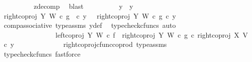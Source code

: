 \begin{isabellebody}
\ \ \ \ \ \ \ \ \isamarkupfalse%
\ z{}{\isacharunderscore}{\kern0pt}decomp\ \isamarkupfalse%
\ blast\isanewline
\ \ \ \ \ \ \ \ \isamarkupfalse%
\ {\isachardoublequoteopen}y{}\ {\isacharequal}{\kern0pt}\ y{}{\isachardoublequoteclose}\isanewline
\ \ \ \ \ \ \ \ \isamarkupfalse%
\ {\isacharminus}{\kern0pt}\ \isanewline
\ \ \ \ \ \ \ \ \ \ \isamarkupfalse%
\ {\isachardoublequoteopen}right{\isacharunderscore}{\kern0pt}coproj\ Y\ W\ {\isasymcirc}\isactrlsub c\ g\ \ {\isasymcirc}\isactrlsub c\ y{}\ \ {\isacharequal}{\kern0pt}\ {\isacharparenleft}{\kern0pt}right{\isacharunderscore}{\kern0pt}coproj\ Y\ W\ {\isasymcirc}\isactrlsub c\ g{\isacharparenright}{\kern0pt}\ {\isasymcirc}\isactrlsub c\ y{}{\isachardoublequoteclose}\isanewline
\ \ \ \ \ \ \ \ \ \ \ \ \isamarkupfalse%
\ comp{\isacharunderscore}{\kern0pt}associative{}\ type{\isacharunderscore}{\kern0pt}assms{\isacharparenleft}{\kern0pt}{}{\isacharparenright}{\kern0pt}\ y{}{\isacharunderscore}{\kern0pt}def\ \isamarkupfalse%
\ {\isacharparenleft}{\kern0pt}typecheck{\isacharunderscore}{\kern0pt}cfuncs{\isacharcomma}{\kern0pt}\ auto{\isacharparenright}{\kern0pt}\isanewline
\ \ \ \ \ \ \ \ \ \ \isamarkupfalse%
\ \isamarkupfalse%
\ {\isachardoublequoteopen}{\isachardot}{\kern0pt}{\isachardot}{\kern0pt}{\isachardot}{\kern0pt}\ {\isacharequal}{\kern0pt}\isanewline
\ \ \ \ \ \ \ \ \ \ \ \ \ \ \ \ {\isacharparenleft}{\kern0pt}{\isacharparenleft}{\kern0pt}{\isacharparenleft}{\kern0pt}left{\isacharunderscore}{\kern0pt}coproj\ Y\ W\ {\isasymcirc}\isactrlsub c\ f{\isacharparenright}{\kern0pt}\ {\isasymamalg}\ {\isacharparenleft}{\kern0pt}right{\isacharunderscore}{\kern0pt}coproj\ Y\ W\ {\isasymcirc}\isactrlsub c\ g{\isacharparenright}{\kern0pt}{\isacharparenright}{\kern0pt}\ {\isasymcirc}\isactrlsub c\ right{\isacharunderscore}{\kern0pt}coproj\ X\ V{\isacharparenright}{\kern0pt}\ {\isasymcirc}\isactrlsub c\ y{}{\isachardoublequoteclose}\isanewline
\ \ \ \ \ \ \ \ \ \ \ \ \isamarkupfalse%
\ right{\isacharunderscore}{\kern0pt}coproj{\isacharunderscore}{\kern0pt}cfunc{\isacharunderscore}{\kern0pt}coprod\ type{\isacharunderscore}{\kern0pt}assms\ \isamarkupfalse%
\ {\isacharparenleft}{\kern0pt}typecheck{\isacharunderscore}{\kern0pt}cfuncs{\isacharcomma}{\kern0pt}\ fastforce{\isacharparenright}{\kern0pt}\isanewline
\ \ \ \ \ \ \ \ \ \ \isamarkupfalse%

\end{isabellebody}
